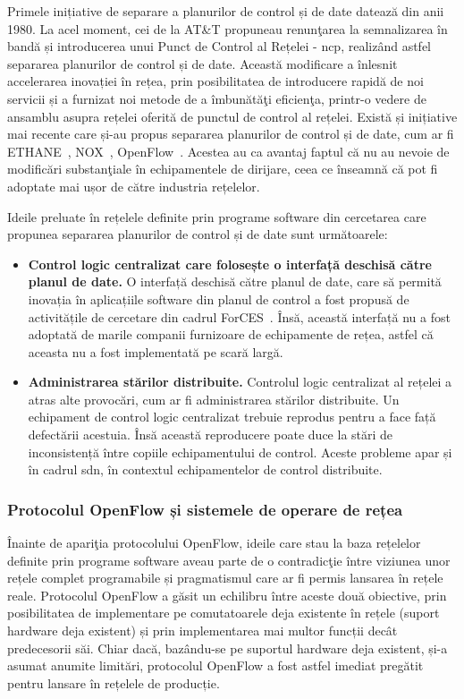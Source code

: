 Primele inițiative de separare a planurilor de control și de date datează din anii 1980. La acel moment, cei de la AT\&T propuneau renunţarea la semnalizarea în bandă și introducerea unui Punct de Control al Rețelei - \gls{ncp}, realizând astfel separarea planurilor de control și de date. Această modificare a înlesnit accelerarea inovației în rețea, prin posibilitatea de introducere rapidă de noi servicii și a furnizat noi metode de a îmbunătăţi eficienţa, printr-o vedere de ansamblu asupra rețelei oferită de punctul de control al rețelei. Există și inițiative mai recente care și-au propus separarea planurilor de control și de date, cum ar fi ETHANE~\cite{casado2007ethane}, NOX~\cite{gude2008nox}, OpenFlow~\cite{mckeown2008openflow}. Acestea au ca avantaj faptul că nu au nevoie de modificări substanţiale în echipamentele de dirijare, ceea ce înseamnă că pot fi adoptate mai ușor de către industria rețelelor.

Ideile preluate în rețelele definite prin programe software din cercetarea care propunea separarea planurilor de control și de date sunt următoarele:
\begin{itemize}
	\item \textbf{Control logic centralizat care folosește o interfață deschisă către planul de date.} O interfață deschisă către planul de date, care să permită inovația în aplicațiile software din planul de control a fost propusă de activitățile de cercetare din cadrul ForCES~\cite{haleplidis2015network}. Însă, această interfață nu a fost adoptată de marile companii furnizoare de echipamente de rețea, astfel că aceasta nu a fost implementată pe scară largă.
	\item \textbf{Administrarea stărilor distribuite.} Controlul logic centralizat al rețelei a atras alte provocări, cum ar fi administrarea stărilor distribuite. Un echipament de control logic centralizat trebuie reprodus pentru a face față defectării acestuia. Însă această reproducere poate duce la stări de inconsistență între copiile echipamentului de control. Aceste probleme apar și în cadrul \gls{sdn}, în contextul echipamentelor de control distribuite.
\end{itemize}

\subsubsection{Protocolul OpenFlow și sistemele de operare de rețea}

Înainte de apariţia protocolului OpenFlow, ideile care stau la baza rețelelor definite prin programe software aveau parte de o contradicţie între viziunea unor rețele complet programabile și pragmatismul care ar fi permis lansarea în rețele reale. Protocolul OpenFlow a găsit un echilibru între aceste două obiective, prin posibilitatea de implementare pe comutatoarele deja existente în rețele (suport hardware deja existent) și prin implementarea mai multor funcții decât predecesorii săi. Chiar dacă, bazându-se pe suportul hardware deja existent, și-a asumat anumite limitări, protocolul OpenFlow a fost astfel imediat pregătit pentru lansare în rețelele de producție.


